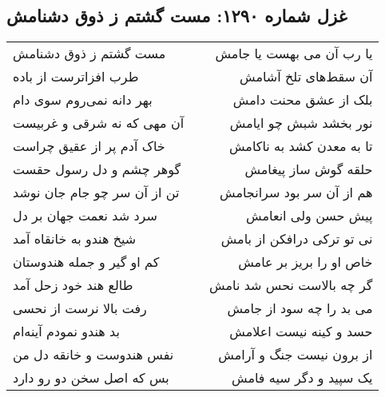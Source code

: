 \begin{center}
\section*{غزل شماره ۱۲۹۰: مست گشتم ز ذوق دشنامش}
\label{sec:1290}
\begin{longtable}{l p{0.5cm} r}
مست گشتم ز ذوق دشنامش
&&
یا رب آن می بهست یا جامش
\\
طرب افزاترست از باده
&&
آن سقط‌های تلخ آشامش
\\
بهر دانه نمی‌روم سوی دام
&&
بلک از عشق محنت دامش
\\
آن مهی که نه شرقی و غربیست
&&
نور بخشد شبش چو ایامش
\\
خاک آدم پر از عقیق چراست
&&
تا به معدن کشد به ناکامش
\\
گوهر چشم و دل رسول حقست
&&
حلقه گوش ساز پیغامش
\\
تن از آن سر چو جام جان نوشد
&&
هم از آن سر بود سرانجامش
\\
سرد شد نعمت جهان بر دل
&&
پیش حسن ولی انعامش
\\
شیخ هندو به خانقاه آمد
&&
نی تو ترکی درافکن از بامش
\\
کم او گیر و جمله هندوستان
&&
خاص او را بریز بر عامش
\\
طالع هند خود زحل آمد
&&
گر چه بالاست نحس شد نامش
\\
رفت بالا نرست از نحسی
&&
می بد را چه سود از جامش
\\
بد هندو نمودم آینه‌ام
&&
حسد و کینه نیست اعلامش
\\
نفس هندوست و خانقه دل من
&&
از برون نیست جنگ و آرامش
\\
بس که اصل سخن دو رو دارد
&&
یک سپید و دگر سیه فامش
\\
\end{longtable}
\end{center}
